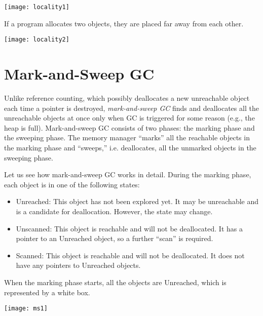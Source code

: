 \begin{center}
\texttt{[image: locality1]}
\end{center}

If a program allocates two objects, they are placed far away from each other.

\begin{center}
\texttt{[image: locality2]}
\end{center}

\section{Mark-and-Sweep GC}

Unlike reference counting, which possibly deallocates a new unreachable object
each time a pointer is destroyed, \textit{mark-and-sweep
GC} finds and deallocates all the
unreachable objects at once only when GC is triggered for some reason (e.g., the
heap is full). Mark-and-sweep GC consists of two phases: the marking phase and
the sweeping phase. The memory manager ``marks'' all the reachable objects in
the marking phase and ``sweeps,'' i.e. deallocates, all the unmarked objects in
the sweeping phase.

\newcommand{\urch}{\textsf{Unreached}\xspace}
\newcommand{\uscn}{\textsf{Unscanned}\xspace}
\newcommand{\scn}{\textsf{Scanned}\xspace}

Let us see how mark-and-sweep GC works in detail. During the marking phase, each
object is in one of the following states:
\begin{itemize}
  \item \urch: This object has not been explored yet. It may be unreachable and is a candidate
    for deallocation. However, the state may change.
  \item \uscn: This object is reachable and will not be deallocated. It has a
    pointer to an \urch object, so a further ``scan'' is required.
  \item \scn: This object is reachable and will not be deallocated. It does not
    have any pointers to \urch objects.
\end{itemize}

When the marking phase starts, all the objects are \urch, which is
represented by a white box.

\begin{center}
\texttt{[image: ms1]}
\end{center}

